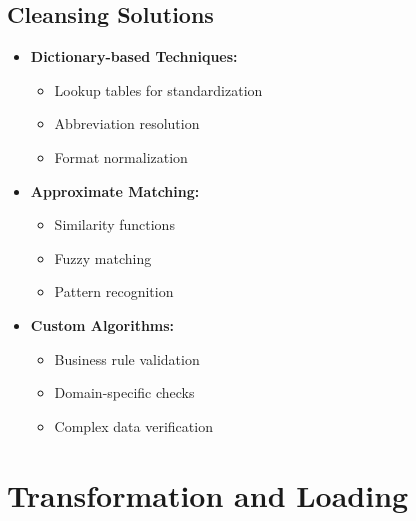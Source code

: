 \subsection{Cleansing Solutions}
\begin{itemize}
    \item \textbf{Dictionary-based Techniques:}
        \begin{itemize}
            \item Lookup tables for standardization
            \item Abbreviation resolution
            \item Format normalization
        \end{itemize}
    \item \textbf{Approximate Matching:}
        \begin{itemize}
            \item Similarity functions
            \item Fuzzy matching
            \item Pattern recognition
        \end{itemize}
    \item \textbf{Custom Algorithms:}
        \begin{itemize}
            \item Business rule validation
            \item Domain-specific checks
            \item Complex data verification
        \end{itemize}
\end{itemize}

\section{Transformation and Loading}

